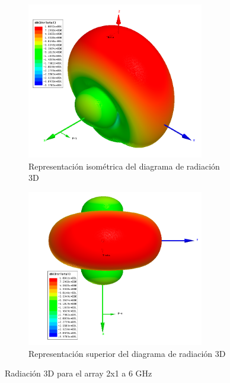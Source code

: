 \begin{figure}[H]
     \centering
     \begin{subfigure}[b]{0.7\textwidth}
         \centering
         \includegraphics[width=0.85\textwidth]{archivos/analisis/2x12/6}
         \caption{Representación isométrica del diagrama de radiación 3D}
         \label{fig:3d12x12}
     \end{subfigure}
     \hfill
     \begin{subfigure}[b]{0.7\textwidth}
         \centering
         \includegraphics[width=0.85\textwidth]{archivos/analisis/2x12/7}
         \caption{Representación superior del diagrama de radiación 3D}
         \label{fig:3d22x12}
     \end{subfigure}
     \hfill
        \caption{Radiación 3D para el array 2x1 a 6 GHz}
        \label{fig:3d2x12}
\end{figure}


